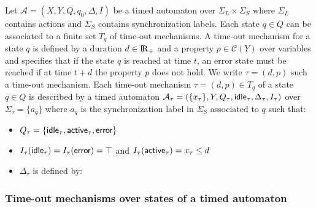 \documentclass[a4paper,10pt]{article}
\def\A{\ensuremath{\mathcal{A}}}
\def\C{\ensuremath{\mathcal{C}}}
\def\bbbr{{\rm I\!R }}
\def\idle{{\mbox{\sf idle}}}
\def\aactive{{\mbox{\sf active}}}
\def\error{{\mbox{\sf error}}}
\begin{document}
Let $\A = (X,Y,Q,q_0,\Delta,I)$ be a timed automaton
over $\Sigma_L \times \Sigma_S$ where $\Sigma_L$ contains actions and
$\Sigma_S$ contains synchronization labels.
Each state $q \in Q$ can be associated to a
finite set $T_q$ of time-out mechanisms. A time-out mechanism for a state
$q$ is defined by a duration $d \in \bbbr_+$ and a property $p \in \C(Y)$
over variables and specifies that if the state $q$ is reached at time
$t$, an error state must be reached if at time $t + d$  the property
$p$ does not hold. We write $\tau = (d,p)$ such a time-out mechanism.
Each time-out mechanism $\tau=(d,p) \in T_q$ of a state $q \in Q$ is described by a timed
automaton $\A_\tau = (\{ x_\tau \},Y,Q_\tau, \idle_\tau ,
\Delta_\tau,I_\tau)$ 
over $\Sigma_\tau = \{ a_q \}$ where
$a_q$ is the synchronization label in $\Sigma_S$ associated to $q$
such that:
\begin{itemize}
\item $Q_\tau = \{ \idle_\tau, \aactive_\tau ,
\error \}$
\item $I_\tau(\idle_\tau) = I_\tau(\error) = \top$ and
  $I_\tau(\aactive_\tau) =  x_\tau \leq d$ 
\item $\Delta_\tau$ is defined by:



\end{itemize}


\subsubsection*{Time-out mechanisms over states of a timed automaton}
\end{document}
